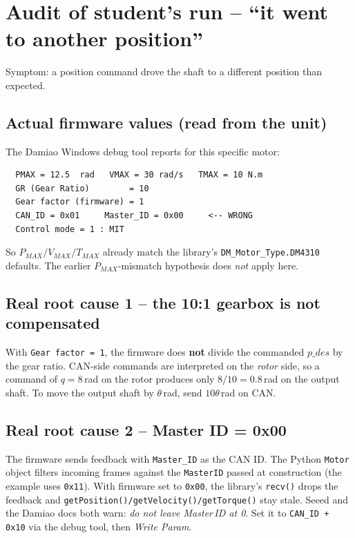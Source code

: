 \documentclass[11pt,a4paper]{article}
\begin{document}
\section{Audit of student's run -- ``it went to another position''}
Symptom: a position command drove the shaft to a different position than
expected.

\subsection{Actual firmware values (read from the unit)}
The Damiao Windows debug tool reports for this specific motor:
\begin{verbatim}
  PMAX = 12.5  rad   VMAX = 30 rad/s   TMAX = 10 N.m
  GR (Gear Ratio)        = 10
  Gear factor (firmware) = 1
  CAN_ID = 0x01     Master_ID = 0x00     <-- WRONG
  Control mode = 1 : MIT
\end{verbatim}
So $P_{MAX}/V_{MAX}/T_{MAX}$ already match the library's
\texttt{DM\_Motor\_Type.DM4310} defaults. The earlier $P_{MAX}$-mismatch
hypothesis does \emph{not} apply here.

\subsection{Real root cause 1 -- the 10:1 gearbox is not compensated}
With \texttt{Gear factor = 1}, the firmware does \textbf{not} divide the
commanded $p\_des$ by the gear ratio. CAN-side commands are interpreted on the
\emph{rotor} side, so a command of $q=8$\,rad on the rotor produces only
$8/10 = 0.8$\,rad on the output shaft. To move the output shaft by
$\theta$\,rad, send $10\theta$\,rad on CAN.

\subsection{Real root cause 2 -- Master ID = 0x00}
The firmware sends feedback with \texttt{Master\_ID} as the CAN ID. The Python
\texttt{Motor} object filters incoming frames against the \texttt{MasterID}
passed at construction (the example uses \texttt{0x11}). With firmware
set to \texttt{0x00}, the library's \texttt{recv()} drops the feedback and
\texttt{getPosition()/getVelocity()/getTorque()} stay stale. Seeed and the
Damiao docs both warn: \emph{do not leave Master\,ID at 0}. Set it to
\texttt{CAN\_ID + 0x10} via the debug tool, then \emph{Write Param}.
\end{document}
